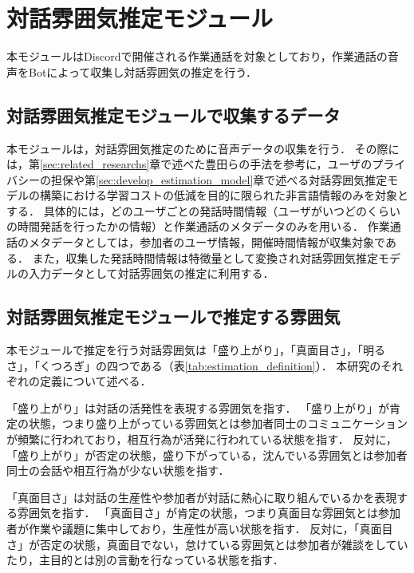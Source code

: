\section{対話雰囲気推定モジュール\label{node:estimation_module}}

本モジュールはDiscordで開催される作業通話を対象としており，作業通話の音声をBotによって収集し対話雰囲気の推定を行う．

\subsection{対話雰囲気推定モジュールで収集するデータ}

本モジュールは，対話雰囲気推定のために音声データの収集を行う．
その際には，第\ref{sec:related_researchs}章で述べた豊田らの手法を参考に，ユーザのプライバシーの担保や第\ref{sec:develop_estimation_model}章で述べる対話雰囲気推定モデルの構築における学習コストの低減を目的に限られた非言語情報のみを対象とする．
具体的には，どのユーザごとの発話時間情報（ユーザがいつどのくらいの時間発話を行ったかの情報）と作業通話のメタデータのみを用いる．
作業通話のメタデータとしては，参加者のユーザ情報，開催時間情報が収集対象である．
また，収集した発話時間情報は特徴量として変換され対話雰囲気推定モデルの入力データとして対話雰囲気の推定に利用する．

\subsection{対話雰囲気推定モジュールで推定する雰囲気\label{node:estimated_atmosphere}}

本モジュールで推定を行う対話雰囲気は「盛り上がり」，「真面目さ」，「明るさ」，「くつろぎ」の四つである（表\ref{tab:estimation_definition}）．
本研究のそれぞれの定義について述べる．

「盛り上がり」は対話の活発性を表現する雰囲気を指す．
「盛り上がり」が肯定の状態，つまり盛り上がっている雰囲気とは参加者同士のコミュニケーションが頻繁に行われており，相互行為が活発に行われている状態を指す．
反対に，「盛り上がり」が否定の状態，盛り下がっている，沈んでいる雰囲気とは参加者同士の会話や相互行為が少ない状態を指す．

「真面目さ」は対話の生産性や参加者が対話に熱心に取り組んでいるかを表現する雰囲気を指す．
「真面目さ」が肯定の状態，つまり真面目な雰囲気とは参加者が作業や議題に集中しており，生産性が高い状態を指す．
反対に，「真面目さ」が否定の状態，真面目でない，怠けている雰囲気とは参加者が雑談をしていたり，主目的とは別の言動を行なっている状態を指す．

